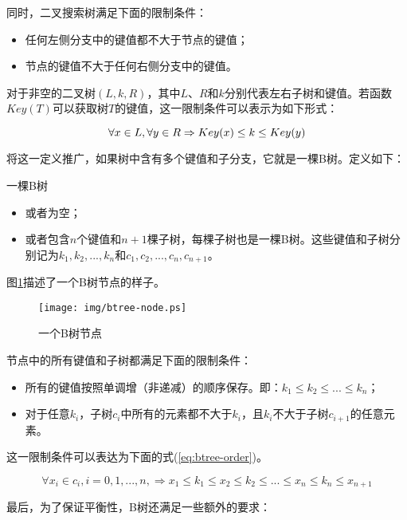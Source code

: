 \documentclass[UTF8]{article}
\begin{document}
同时，二叉搜索树满足下面的限制条件：
\begin{itemize}
\item 任何左侧分支中的键值都不大于节点的键值；
\item 节点的键值不大于任何右侧分支中的键值。
\end{itemize}

对于非空的二叉树$(L, k, R)$，其中$L$、$R$和$k$分别代表左右子树和键值。若函数$Key(T)$可以获取树$T$的键值，这一限制条件可以表示为如下形式：

\begin{equation}
\forall x \in L, \forall y \in R \\
\Rightarrow Key(x) \leq k \leq Key(y)
\end{equation}

将这一定义推广，如果树中含有多个键值和子分支，它就是一棵B树。定义如下：

一棵B树
\begin{itemize}
\item 或者为空；
\item 或者包含$n$个键值和$n+1$棵子树，每棵子树也是一棵B树。这些键值和子树分别记为$k_1, k_2, ..., k_n$和$c_1, c_2, ..., c_n, c_{n+1}$。
\end{itemize}

图\ref{fig:btree-node}描述了一个B树节点的样子。

\begin{figure}[htbp]
  \centering
	\texttt{[image: img/btree-node.ps]}
  \caption{一个B树节点} \label{fig:btree-node}
\end{figure}

节点中的所有键值和子树都满足下面的限制条件：

\begin{itemize}
\item 所有的键值按照单调增（非递减）的顺序保存。即：$k_1 \leq k_2 \leq ... \leq k_n$；
\item 对于任意$k_i$，子树$c_i$中所有的元素都不大于$k_i$，且$k_i$不大于子树$c_{i+1}$的任意元素。
\end{itemize}

这一限制条件可以表达为下面的式(\ref{eq:btree-order})。

\begin{equation}
\forall x_i \in c_i, i=0, 1, ..., n, \Rightarrow x_1 \leq k_1 \leq
x_2 \leq k_2 \leq ... \leq x_n \leq k_n \leq x_{n+1}
\label{eq:btree-order}
\end{equation}

最后，为了保证平衡性，B树还满足一些额外的要求：
\end{document}
